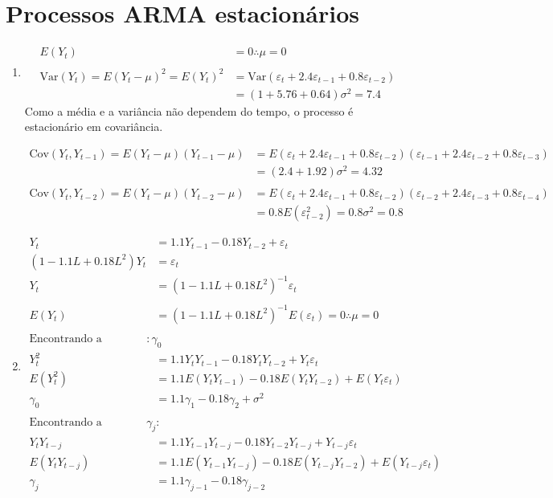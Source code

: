 \setcounter{chapter}{2}
\chapter{Processos ARMA estacionários}

\begin{enumerate}
	\item[\fbox{3.1}]
		\begin{align*}
		E(Y_t)&=0 \therefore \mu=0\\
		\\
		\text{Var}(Y_t)=E(Y_t-\mu)^2=E(Y_t)^2&=\text{Var}(\varepsilon_t+2.4\varepsilon_{t-1}+0.8\varepsilon_{t-2})\\
		&=(1+5.76+0.64)\sigma^2=7.4
		\end{align*}
		Como a média e a variância não dependem do tempo, o processo é estacionário em covariância.
		
		\begin{align*}
		\text{Cov}(Y_t,Y_{t-1})=E(Y_t-\mu)(Y_{t-1}-\mu)&=E(\varepsilon_t+2.4\varepsilon_{t-1}+0.8\varepsilon_{t-2})(\varepsilon_{t-1}+2.4\varepsilon_{t-2}+0.8\varepsilon_{t-3})\\
		&=(2.4+1.92)\sigma^2=4.32\\
		\\
		\text{Cov}(Y_t,Y_{t-2})=E(Y_t-\mu)(Y_{t-2}-\mu)&=E(\varepsilon_t+2.4\varepsilon_{t-1}+0.8\varepsilon_{t-2})(\varepsilon_{t-2}+2.4\varepsilon_{t-3}+0.8\varepsilon_{t-4})\\
		&=0.8E(\varepsilon_{t-2}^2)=0.8\sigma^2=0.8
		\end{align*}
		
		\item[\fbox{3.2}]
		\begin{align*}
			Y_t&=1.1Y_{t-1}-0.18Y_{t-2}+\varepsilon_t\\
			(1-1.1L+0.18L^2)Y_t&=\varepsilon_t\\
			Y_t&=(1-1.1L+0.18L^2)^{-1}\varepsilon_t\\
			\\
			E(Y_t)&=(1-1.1L+0.18L^2)^{-1}E(\varepsilon_t)=0 \therefore \mu=0\\
			\\
			\text{Encontrando a variância }:\gamma_0\\
			Y_t^2&=1.1Y_tY_{t-1}-0.18Y_tY_{t-2}+Y_t\varepsilon_t\\
			E(Y_t^2)&=1.1E(Y_tY_{t-1})-0.18E(Y_tY_{t-2})+E(Y_t\varepsilon_t)\\
			\gamma_0&=1.1\gamma_1-0.18\gamma_2+\sigma^2\\
			\\
			\text{Encontrando a autocovariância } \gamma_j:\\
			Y_tY_{t-j}&=1.1Y_{t-1}Y_{t-j}-0.18Y_{t-2}Y_{t-j}+Y_{t-j}\varepsilon_t\\
			E(Y_tY_{t-j})&=1.1E(Y_{t-1}Y_{t-j})-0.18E(Y_{t-j}Y_{t-2})+E(Y_{t-j}\varepsilon_t)\\
			\gamma_j&=1.1\gamma_{j-1}-0.18\gamma_{j-2}\\
		\end{align*}
		

\end{enumerate}
